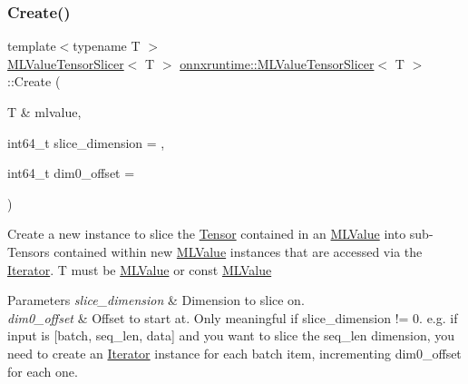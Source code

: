 \mbox{\label{classonnxruntime_1_1MLValueTensorSlicer_ac99401612f9fd60873bc56b84bc003c6}} 
\subsubsection{\texorpdfstring{Create()}{Create()}}
{\footnotesize\ttfamily template$<$typename T $>$ \\
\mbox{\hyperlink{classonnxruntime_1_1MLValueTensorSlicer}{M\+L\+Value\+Tensor\+Slicer}}$<$ T $>$ \mbox{\hyperlink{classonnxruntime_1_1MLValueTensorSlicer}{onnxruntime\+::\+M\+L\+Value\+Tensor\+Slicer}}$<$ T $>$\+::Create (\begin{DoxyParamCaption}\item[{T \&}]{mlvalue,  }\item[{int64\+\_\+t}]{slice\+\_\+dimension = {},  }\item[{int64\+\_\+t}]{dim0\+\_\+offset = {} }\end{DoxyParamCaption})\hspace{0.3cm}{\ttfamily [static]}}

Create a new instance to slice the \mbox{\hyperlink{classonnxruntime_1_1Tensor}{Tensor}} contained in an \mbox{\hyperlink{classonnxruntime_1_1MLValue}{M\+L\+Value}} into sub-\/\+Tensors contained within new \mbox{\hyperlink{classonnxruntime_1_1MLValue}{M\+L\+Value}} instances that are accessed via the \mbox{\hyperlink{classonnxruntime_1_1MLValueTensorSlicer_1_1Iterator}{Iterator}}. T must be \textquotesingle{}\mbox{\hyperlink{classonnxruntime_1_1MLValue}{M\+L\+Value}}\textquotesingle{} or \textquotesingle{}const \mbox{\hyperlink{classonnxruntime_1_1MLValue}{M\+L\+Value}}\textquotesingle{} 
\begin{DoxyParams}{Parameters}
{\em slice\+\_\+dimension} & Dimension to slice on. \\
\hline
{\em dim0\+\_\+offset} & Offset to start at. Only meaningful if slice\+\_\+dimension != 0. e.\+g. if input is \mbox{[}batch, seq\+\_\+len, data\mbox{]} and you want to slice the seq\+\_\+len dimension, you need to create an \mbox{\hyperlink{classonnxruntime_1_1MLValueTensorSlicer_1_1Iterator}{Iterator}} instance for each batch item, incrementing dim0\+\_\+offset for each one. \\
\hline
\end{DoxyParams}
\mbox{\label{classonnxruntime_1_1MLValueTensorSlicer_a708fbd080203261cda938c0f260fd099}} 
